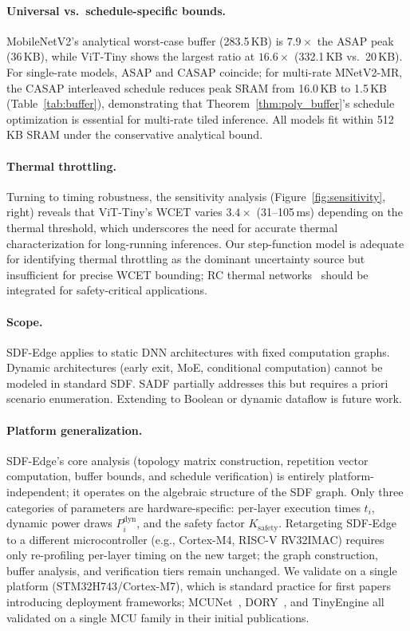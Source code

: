 \documentclass[journal]{IEEEtran}
\begin{document}
\paragraph{Universal vs.\ schedule-specific bounds.}
MobileNetV2's analytical worst-case buffer (283.5\,KB) is $7.9\times$ the ASAP peak (36\,KB), while ViT-Tiny shows the largest ratio at $16.6\times$ (332.1\,KB vs.\ 20\,KB).
For single-rate models, ASAP and CASAP coincide; for multi-rate MNetV2-MR, the CASAP interleaved schedule reduces peak SRAM from 16.0\,KB to 1.5\,KB (Table~\ref{tab:buffer}), demonstrating that Theorem~\ref{thm:poly_buffer}'s schedule optimization is essential for multi-rate tiled inference.
All models fit within 512\,KB SRAM under the conservative analytical bound.

\paragraph{Thermal throttling.}
Turning to timing robustness, the sensitivity analysis (Figure~\ref{fig:sensitivity}, right) reveals that ViT-Tiny's WCET varies $3.4\times$ (31--105\,ms) depending on the thermal threshold, which underscores the need for accurate thermal characterization for long-running inferences.
Our step-function model is adequate for identifying thermal throttling as the dominant uncertainty source but insufficient for precise WCET bounding; RC thermal networks~\cite{skadron2004temperature} should be integrated for safety-critical applications.

\paragraph{Scope.}
SDF-Edge applies to static DNN architectures with fixed computation graphs.
Dynamic architectures (early exit, MoE, conditional computation) cannot be modeled in standard SDF.
SADF partially addresses this but requires a priori scenario enumeration.
Extending to Boolean or dynamic dataflow is future work.

\paragraph{Platform generalization.}
SDF-Edge's core analysis (topology matrix construction, repetition vector computation, buffer bounds, and schedule verification) is entirely platform-independent; it operates on the algebraic structure of the SDF graph.
Only three categories of parameters are hardware-specific: per-layer execution times $t_i$, dynamic power draws $P_i^{\mathrm{dyn}}$, and the safety factor $K_{\mathrm{safety}}$.
Retargeting SDF-Edge to a different microcontroller (e.g., Cortex-M4, RISC-V RV32IMAC) requires only re-profiling per-layer timing on the new target; the graph construction, buffer analysis, and verification tiers remain unchanged.
We validate on a single platform (STM32H743/Cortex-M7), which is standard practice for first papers introducing deployment frameworks; MCUNet~\cite{lin2020mcunet}, DORY~\cite{burrello2021dory}, and TinyEngine all validated on a single MCU family in their initial publications.
\end{document}
